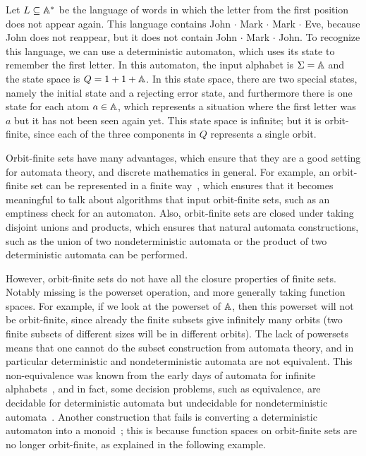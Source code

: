 \documentclass[a4paper,UKenglish,cleveref, autoref, numberwithinsect, thm-restate]{lipics-v2021}
\begin{document}
\begin{example}\label{ex:first-letter-repeats}
    Let  $L \subseteq \mathbb A^*$ be the language of  words in which the letter from the first position does not appear again. This language contains John $\cdot$ Mark $\cdot$ Mark $\cdot$ Eve, because John does not reappear, but it does not contain John $\cdot$ Mark $\cdot$ John. To recognize this language, we can use a deterministic automaton, which uses its state to remember the first letter. In this automaton, the input alphabet is $\Sigma = \mathbb A$ and  the state space is $Q = 1 + 1 + \mathbb A$. In this state space, there are two special states, namely the initial state and a rejecting error state, and furthermore there is one state for each atom $a \in \mathbb A$, which represents a situation where the first letter was $a$ but it has not been seen again yet. This state space is infinite; but it is orbit-finite, since each of the three components in $Q$ represents a single orbit.\exampleend
\end{example}

Orbit-finite sets have many advantages, which ensure that they are a good setting for automata theory, and discrete mathematics in general. For example, an orbit-finite set can be represented in a finite way~\cite{bojanczyk_slightly2018}, which ensures that it becomes meaningful to talk about algorithms that input orbit-finite sets, such as an emptiness check for an automaton. Also, orbit-finite sets are closed under taking disjoint unions and products, which ensures that natural automata constructions, such as the union of two nondeterministic automata or the product of two deterministic automata can be performed.

However, orbit-finite sets do not have all the closure properties of finite sets. Notably missing is the powerset operation, and more generally taking function spaces. For example, if we look at the powerset of $\mathbb A$, then this powerset will not be orbit-finite, since already the finite subsets give infinitely many orbits (two finite subsets of different sizes will be in different orbits). The lack of powersets means that one cannot do the subset construction from automata theory, and in particular deterministic and nondeterministic automata are not equivalent. This non-equivalence was known from the early days of automata for infinite alphabets~\cite{kaminskiFiniteMemoryAutomata1994}, and in fact, some decision problems, such as equivalence, are decidable for deterministic automata but undecidable for nondeterministic automata~\cite{nevenFiniteStateMachines2004}. Another construction that fails is converting a deterministic automaton into a monoid~\cite[p.~221]{bojanczykNominalMonoids2013}; this is because function spaces on orbit-finite sets are no longer orbit-finite, as explained in the following example. 
\end{document}
